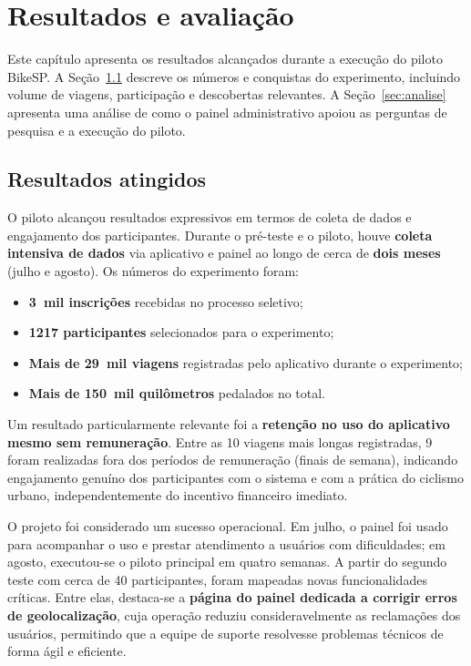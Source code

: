 
\chapter{Resultados e avaliação}
\label{cap:resultados}

Este capítulo apresenta os resultados alcançados durante a execução do piloto BikeSP. A Seção~\ref{sec:resultados-atingidos} descreve os números e conquistas do experimento, incluindo volume de viagens, participação e descobertas relevantes. A Seção~\ref{sec:analise} apresenta uma análise de como o painel administrativo apoiou as perguntas de pesquisa e a execução do piloto.

\section{Resultados atingidos}
\label{sec:resultados-atingidos}
O piloto alcançou resultados expressivos em termos de coleta de dados e
engajamento dos participantes. Durante o pré-teste e o piloto, houve
\textbf{coleta intensiva de dados} via aplicativo e painel ao longo de cerca de
\textbf{dois meses} (julho e agosto). Os números do experimento foram:
\begin{itemize}
  \item \textbf{3~mil inscrições} recebidas no processo seletivo;
  \item \textbf{1217 participantes} selecionados para o experimento;
  \item \textbf{Mais de 29~mil viagens} registradas pelo aplicativo durante o
        experimento;
  \item \textbf{Mais de 150~mil quilômetros} pedalados no total.
\end{itemize}

Um resultado particularmente relevante foi a \textbf{retenção no uso do
aplicativo mesmo sem remuneração}. Entre as 10 viagens mais longas registradas,
9 foram realizadas fora dos períodos de remuneração (finais de semana),
indicando engajamento genuíno dos participantes com o sistema e com a prática do
ciclismo urbano, independentemente do incentivo financeiro imediato.

O projeto foi considerado um sucesso operacional. Em julho, o painel foi usado
para acompanhar o uso e prestar atendimento a usuários com dificuldades; em
agosto, executou-se o piloto principal em quatro semanas. A partir do segundo
teste com cerca de 40 participantes, foram mapeadas novas funcionalidades
críticas. Entre elas, destaca-se a \textbf{página do painel dedicada a corrigir
erros de geolocalização}, cuja operação reduziu consideravelmente as reclamações
dos usuários, permitindo que a equipe de suporte resolvesse problemas técnicos
de forma ágil e eficiente.

